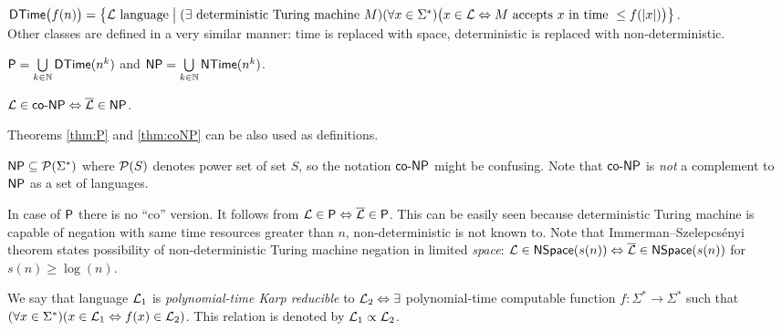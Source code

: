 		\begin{defn}\label{def:DTime}
			$\DTime\bigl(f(n)\bigr) = \bigl\{ {\cal L}\textnormal{ language} \bigm| (\exists \textnormal{ deterministic Turing machine }M)\\ (\forall x\in\Sigma^*)\bigl(x\in{\cal L} \iff M\textnormal{ accepts }x\textnormal{ in time }\leq f(|x|)\bigr) \bigr\}$.\\
			Other classes are defined in a very similar manner: time is replaced with space, deterministic is replaced with non-deterministic.
		\end{defn}
		
		\begin{thm}
			\label{thm:P}
			$\P = \bigcup\limits_{k\in\N} \DTime(n^k)$ and $\NP = \bigcup\limits_{k\in\N} \NTime(n^k)$.
		\end{thm}
		
		\begin{thm}
			\label{thm:coNP}
			$ {\cal L} \in \coNP \iff {\cal\overline L} \in \NP $.
		\end{thm}
		
		\begin{note}
			Theorems \ref{thm:P} and \ref{thm:coNP} can be also used as definitions.
		\end{note}
		
		\begin{note}
			$\NP\subseteq\powerset{\Sigma^*}$ where $\powerset{S}$ denotes power set of set $S$, so the notation $\coNP$ might be confusing. Note that $\coNP$ is {\em not} a complement to $\NP$ as a set of languages.
		\end{note}
		
		\begin{remark}
			In case of $\P$ there is no ``co'' version. It follows from ${\cal L} \in \P \iff \overline{\cal L} \in \P$. This can be easily seen because deterministic Turing machine is capable of negation with same time resources greater than $n$, non-deterministic is not known to. Note that Immerman--Szelepcsényi theorem states possibility of non-deterministic Turing machine negation in limited {\em space}: ${\cal L} \in \NSpace(s(n)) \iff \overline{\cal L} \in \NSpace(s(n))$ for $s(n) \geq \log(n)$.
		\end{remark}
		
		\begin{defn}
			We say that language ${\cal L}_1$ is {\em polynomial-time Karp reducible} to ${\cal L}_2 \iff \exists$ polynomial-time computable function $f:\Sigma^*\rightarrow\Sigma^*$ such that $(\forall x\in\Sigma^*)(x\in{\cal L}_1\iff f(x)\in{\cal L}_2)$. This relation is denoted by ${\cal L}_1\propto{\cal L}_2$.
		\end{defn}
		
